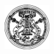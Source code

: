 \documentclass[ignorenonframetext,8pt]{beamer}
\begin{document}
	\begin{frame}
		\begin{center}
			\includegraphics[width=2cm]{Immagini/Unipv-logo-vett}
		\end{center}
		\titlepage
	\end{frame}
\end{document}
